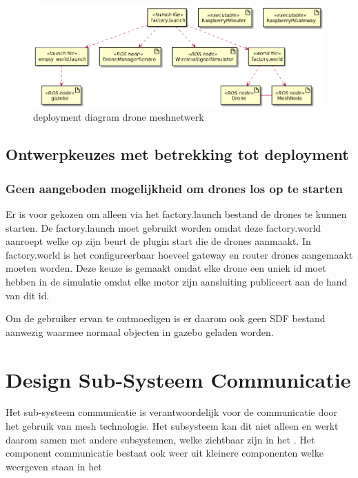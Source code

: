 \documentclass[a4paper, 11pt, oneside]{report}
\begin{document}
\begin{figure}[H]
	\begin{center}\includegraphics[width=\linewidth]{UML/out/DeploymentDiagram/DeploymentDiagram/DeploymentDiagram.png}\end{center}
	\caption{deployment diagram drone meshnetwerk}
	\label{fig:deploymentdiagram}
\end{figure}

\subsection{Ontwerpkeuzes met betrekking tot deployment}
\label{DetailedDesign:deployment:decisisions}

\subsubsection{Geen aangeboden mogelijkheid om drones los op te starten}
Er is voor gekozen om alleen via het factory.launch bestand de drones te kunnen starten. 
De factory.launch moet gebruikt worden omdat deze factory.world aanroept welke op zijn beurt de plugin start die de drones aanmaakt.  
In factory.world is het configureerbaar hoeveel gateway en router drones aangemaakt moeten worden.
Deze keuze is gemaakt omdat elke drone een uniek id moet hebben in de simulatie omdat elke motor zijn aansluiting publiceert aan de hand van dit id.

Om de gebruiker ervan te ontmoedigen is er daarom ook geen SDF bestand aanwezig waarmee normaal objecten in gazebo geladen worden. 

\section{Design Sub-Systeem Communicatie}
Het sub-systeem communicatie is verantwoordelijk voor de communicatie door het gebruik van mesh technologie.
Het subsysteem kan dit niet alleen en werkt daarom samen met andere subsystemen, welke zichtbaar zijn in het  .
Het component communicatie bestaat ook weer uit kleinere componenten welke weergeven staan in het 
  
\end{document}
